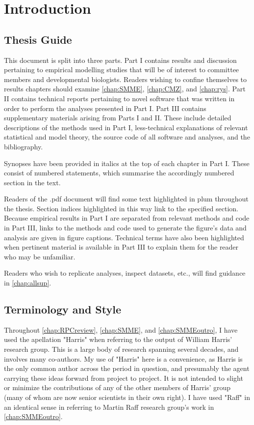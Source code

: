 \section*{Introduction}
\label{ch:intro}

\subsection*{Thesis Guide}
This document is split into three parts. Part I contains results and discussion pertaining to empirical modelling studies that will be of interest to committee members and developmental biologists. Readers wishing to confine themselves to results chapters should examine \autoref{chap:SMME}, \autoref{chap:CMZ}, and \autoref{chap:rys}. Part II contains technical reports pertaining to novel software that was written in order to perform the analyses presented in Part I. Part III contains supplementary materials arising from Parts I and II. These include detailed descriptions of the methods used in Part I, less-technical explanations of relevant statistical and model theory, the source code of all software and analyses, and the bibliography.

Synopses have been provided in italics at the top of each chapter in Part I. These consist of numbered statements, which summarise the accordingly numbered section in the text.

Readers of the .pdf document will find some text highlighted in plum throughout the thesis. Section indices highlighted in this way link to the specified section.  Because empirical results in Part I are separated from relevant methods and code in Part III, links to the methods and code used to generate the figure's data and analysis are given in figure captions. Technical terms have also been highlighted when pertinent material is available in Part III to explain them for the reader who may be unfamiliar.

Readers who wish to replicate analyses, inspect datasets, etc., will find guidance in \autoref{chap:allsup}.

\subsection*{Terminology and Style}
Throughout \autoref{chap:RPCreview}, \autoref{chap:SMME}, and \autoref{chap:SMMEoutro}, I have used the apellation "Harris" when referring to the output of William Harris' research group. This is a large body of research spanning several decades, and involves many co-authors. My use of "Harris" here is a convenience, as Harris is the only common author across the period in question, and presumably the agent carrying these ideas forward from project to project. It is not intended to slight or minimize the contributions of any of the other members of Harris' group (many of whom are now senior scientists in their own right). I have used "Raff" in an identical sense in referring to Martin Raff research group's work in \autoref{chap:SMMEoutro}.

